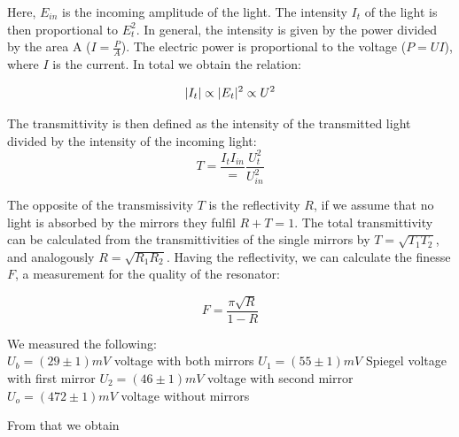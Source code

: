 \documentclass{article}
\DeclarePairedDelimiter\abs{\lvert}{\rvert}%
\begin{document}
Here, $E_{in}$ is the incoming amplitude of the light. The intensity $I_{t}$ of the light is then proportional to $E_{t}^{2}$. In general, the intensity is given by the power divided by the area A ($I=\frac{P}{A}$). The electric power is proportional to the voltage ($P=UI$), where $I$ is the current. In total we obtain the relation:

\begin{equation}
\abs{I_{t}} \propto \abs{E_{t}}^{2} \propto U^{2}
\end{equation}

The transmittivity is then defined as the intensity of the transmitted light divided by the intensity of the incoming light:
\begin{equation}
T = \frac{I_{t}{I_{in}}} = \frac{U_{t}^{2}}{U_{in}^{2}}
\end{equation}

The opposite of the transmissivity $T$ is the reflectivity $R$, if we assume that no light is absorbed by the mirrors they fulfil $R+T=1$. The total transmittivity can be calculated from the transmittivities of the single mirrors by $T = \sqrt{T_{1}T_{2}}$, and analogously  $R = \sqrt{R_{1}R_{2}}$. Having the reflectivity, we can calculate the finesse $F$, a measurement for the quality of the resonator:

\begin{equation}
F= \frac{\pi\sqrt{R}}{1-R}
\end{equation}

We measured the following:\\
$U_b = (29\pm1)mV$ voltage with both mirrors
$U_1 = (55\pm1)mV$  Spiegel voltage with first mirror
$U_2 = (46\pm1)mV$  voltage with second mirror
$U_o = (472\pm1)mV$ voltage without mirrors

From that we obtain 
\end{document}
